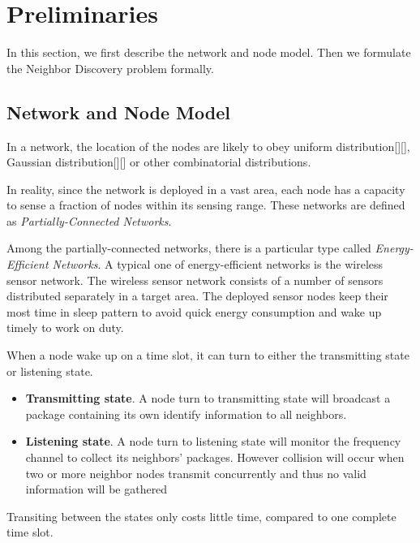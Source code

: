 \section{Preliminaries}
\label{sectionmodel}

In this section, we first describe the network and node model.
Then we formulate the Neighbor Discovery problem formally.  

\subsection{Network and Node Model}

In a network, the location of the nodes are likely to obey uniform distribution[][],
Gaussian distribution[][] or other combinatorial distributions.

In reality, since the network is deployed in a vast area, each node 
has a capacity to sense a fraction of nodes within its sensing range.
These networks are defined as \emph{Partially-Connected Networks}.

Among the partially-connected networks, there is a particular type called \emph{Energy-Efficient Networks}.
A typical one of energy-efficient networks is the wireless sensor network.
The wireless sensor network consists of a number of sensors distributed separately in a target area.
The deployed sensor nodes keep their most time in sleep pattern to avoid quick energy consumption 
and wake up timely to work on duty.


When a node wake up on a time slot, it can turn to either the transmitting state or listening state. 
\begin{itemize}
\item \textbf{Transmitting state}. A node turn to transmitting state will broadcast a package containing its own identify 
information to all neighbors.
\item  \textbf{Listening state}. A node turn to listening state will monitor the frequency channel to collect its neighbors' packages.
However collision will occur when two or more neighbor nodes transmit concurrently and thus no valid information will be gathered
\end{itemize}
Transiting between the states only costs little time, compared to one complete time slot.

